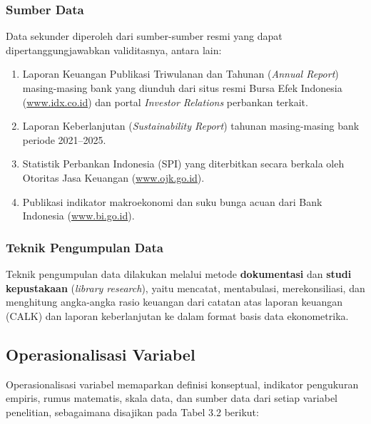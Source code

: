 \documentclass[12pt,a4paper]{article}
\numberwithin{equation}{section}
\begin{document}
\subsubsection{Sumber Data}
\noindent
Data sekunder diperoleh dari sumber-sumber resmi yang dapat dipertanggungjawabkan validitasnya, antara lain:
\begin{enumerate}
  \item Laporan Keuangan Publikasi Triwulanan dan Tahunan (\emph{Annual Report}) masing-masing bank yang diunduh dari situs resmi Bursa Efek Indonesia (\url{www.idx.co.id}) dan portal \emph{Investor Relations} perbankan terkait.
  \item Laporan Keberlanjutan (\emph{Sustainability Report}) tahunan masing-masing bank periode 2021--2025.
  \item Statistik Perbankan Indonesia (SPI) yang diterbitkan secara berkala oleh Otoritas Jasa Keuangan (\url{www.ojk.go.id}).
  \item Publikasi indikator makroekonomi dan suku bunga acuan dari Bank Indonesia (\url{www.bi.go.id}).
\end{enumerate}

\subsubsection{Teknik Pengumpulan Data}
\noindent
Teknik pengumpulan data dilakukan melalui metode \textbf{dokumentasi} dan \textbf{studi kepustakaan} (\emph{library research}), yaitu mencatat, mentabulasi, merekonsiliasi, dan menghitung angka-angka rasio keuangan dari catatan atas laporan keuangan (CALK) dan laporan keberlanjutan ke dalam format basis data ekonometrika.

\subsection{Operasionalisasi Variabel}

\noindent
Operasionalisasi variabel memaparkan definisi konseptual, indikator pengukuran empiris, rumus matematis, skala data, dan sumber data dari setiap variabel penelitian, sebagaimana disajikan pada Tabel 3.2 berikut:
\end{document}
